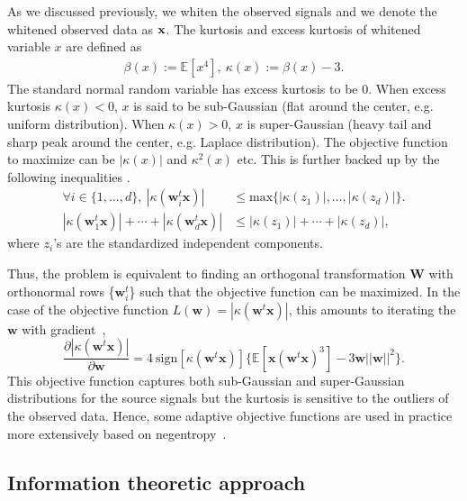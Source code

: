 \documentclass[aps,prl,preprint,superscriptaddress]{revtex4-2}
\begin{document}
As we discussed previously, we whiten the observed signals and we denote the whitened observed data as $\bf{x}$. The kurtosis and excess kurtosis of whitened variable $x$ are defined as
\begin{align}
\beta(x) := \mathbb{E}[x^{4}],~\kappa(x) := \beta(x)-3.
\end{align}
The standard normal random variable has excess kurtosis to be 0. When excess kurtosis $\kappa(x) < 0$, $x$ is said to be sub-Gaussian (flat around the center, e.g. uniform distribution). When $\kappa(x) > 0$, $x$ is super-Gaussian (heavy tail and sharp peak around the center, e.g. Laplace distribution).
The objective function to maximize can be $|\kappa(x)|$ and $\kappa^{2}(x)$ etc. This is further backed up by the following inequalities \cite{miettinen2015fourth}.
\begin{align}
\forall i \in \{1, \ldots, d\}, ~|\kappa(\mathbf{w}_{i}^{t}\mathbf{x})| &\leq \mathrm{max}\{|\kappa(z_1)|, \ldots ,|\kappa(z_d)|\}. \\
|\kappa(\mathbf{w}_{1}^{t}\mathbf{x})|+ \cdots + |\kappa(\mathbf{w}_{d}^{t}\mathbf{x})| &\leq |\kappa(z_1)|+ \cdots +|\kappa(z_d)|,
\end{align}
where $z_{i}$'s are the standardized independent components.

Thus, the problem is equivalent to finding an orthogonal transformation $\mathbf{W}$ with orthonormal rows \{$\mathbf{w}_{i}^{t}$\} such that the objective function can be maximized. In the case of the objective function $L(\mathbf{w}) = |\kappa(\mathbf{w}^{t}\mathbf{x})|$, this amounts to iterating the $\mathbf{w}$ with gradient~\cite{hyvarinen2000independent},
\begin{equation}
\frac{\partial |\kappa(\mathbf{w}^{t}\mathbf{x})|}{\partial \mathbf{w}} = 4~\mathrm{sign} [\kappa(\mathbf{w}^{t}\mathbf{x})]\{\mathbb{E}[\mathbf{x}(\mathbf{w}^{t}\mathbf{x})^{3}]-3\mathbf{w}||\mathbf{w}||^{2}\}.
\end{equation}
This objective function captures both sub-Gaussian and super-Gaussian distributions for the source signals but the kurtosis is sensitive to the outliers of the observed data. Hence, some adaptive objective functions are used in practice more extensively based on negentropy~\cite{hyvarinen2000independent}.

\subsection{Information theoretic approach}
\end{document}
